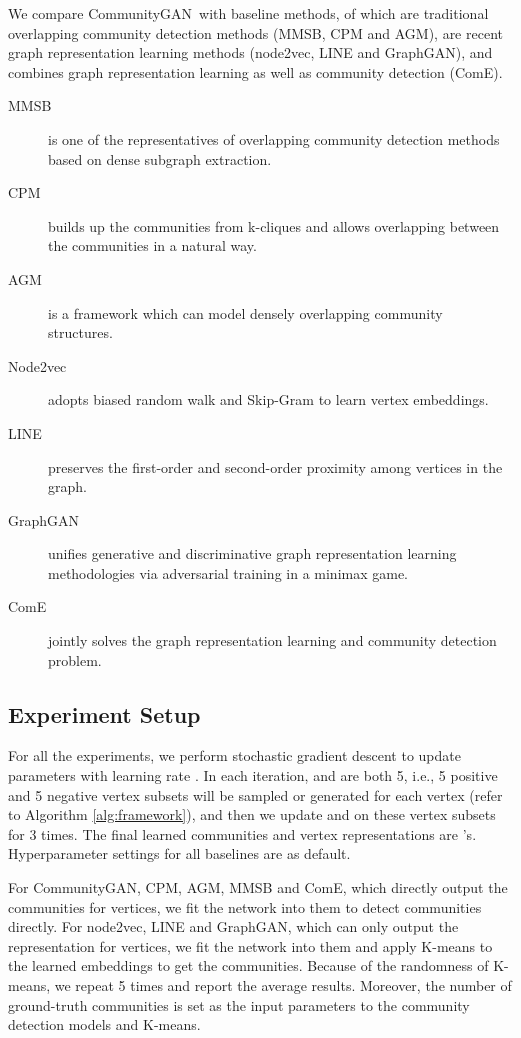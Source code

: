\documentclass[sigconf]{acmart}
\newcommand{\ComGAN}{CommunityGAN}
\begin{document}
We compare \ComGAN~with  baseline methods, of which  are traditional overlapping community detection methods (MMSB, CPM and AGM),  are recent graph representation learning methods (node2vec, LINE and GraphGAN), and  combines graph representation learning as well as community detection (ComE).

\begin{description}
\item[MMSB] \cite{airoldi2009mixed} is one of the representatives of overlapping community detection methods based on dense subgraph extraction.
\item[CPM] \cite{CPM} builds up the communities from k-cliques and allows overlapping between the communities in a natural way.
\item[AGM] \cite{yang2013overlapping} is a framework which can model densely overlapping community structures.
\item[Node2vec] \cite{node2vec} adopts biased random walk and Skip-Gram to learn vertex embeddings.
\item[LINE] \cite{LINE} preserves the first-order and second-order proximity among vertices in the graph.
\item[GraphGAN] \cite{GraphGAN} unifies generative and discriminative graph representation learning methodologies via adversarial training in a minimax game.
\item[ComE] \cite{ComE} jointly solves the graph representation learning and community detection problem.
\end{description}

\subsection{Experiment Setup}
\label{subsec:experiment-setup}
For all the experiments, we perform stochastic gradient descent to update parameters with learning rate .
In each iteration,  and  are both 5, i.e., 5 positive and 5 negative vertex subsets will be sampled or generated for each vertex (refer to Algorithm \ref{alg:framework}), and then we update  and  on these vertex subsets for 3 times.
The final learned communities and vertex representations are 's.
Hyperparameter settings for all baselines are as default.

For \ComGAN, CPM, AGM, MMSB and ComE, which directly output the communities for vertices, we fit the network into them to detect communities directly.
For node2vec, LINE and GraphGAN, which can only output the representation for vertices, we fit the network into them and apply K-means to the learned embeddings to get the communities.
Because of the randomness of K-means, we repeat 5 times and report the average results.
Moreover, the number of ground-truth communities is set as the input parameters to the community detection models and K-means.
\end{document}
